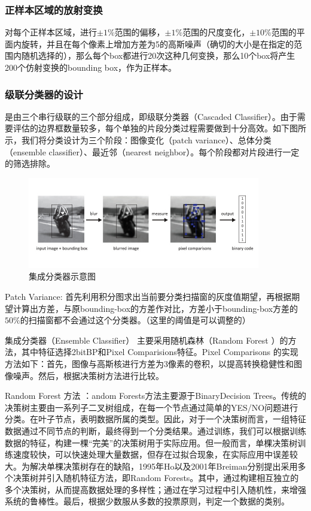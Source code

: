 \subsubsection{正样本区域的放射变换}
对每个正样本区域，进行$±1\%$范围的偏移，$±1\%$范围的尺度变化，$±10\%$范围的平面内旋转，并且在每个像素上增加方差为5的高斯噪声（确切的大小是在指定的范围内随机选择的），那么每个box都进行20次这种几何变换，那么10个box将产生200个仿射变换的bounding box，作为正样本。

\subsubsection{级联分类器的设计}
是由三个串行级联的三个部分组成，即级联分类器（Cascaded Classifier）。由于需要评估的边界框数量较多，每个单独的片段分类过程需要做到十分高效。如下图所示，我们将分类设计为三个阶段：图像变化（patch variance）、总体分类（ensemble classifier）、最近邻（nearest neighbor）。每个阶段都对片段进行一定的筛选排除。
\begin{figure}[htb]   
	\centering
	\includegraphics[width=\textwidth]{figs/161002_Thesis_Tracking_Section_04.pdf}
	\caption{集成分类器示意图}
	\label{fig:161002_Thesis_Tracking_Section_04}
\end{figure}

Patch Variance: 首先利用积分图求出当前要分类扫描窗的灰度值期望，再根据期望计算出方差，与原bounding-box的方差作对比，方差小于bounding-box方差的$50\%$的扫描窗都不会通过这个分类器。（这里的阈值是可以调整的）

集成分类器（Ensemble Classifier） 主要采用随机森林（Random Forest ）的方法，其中特征选择2bitBP和Pixel Comparisions特征。Pixel Comparisons 的实现方法如下：首先，图像与高斯核进行方差为3像素的卷积，以提高转换稳健性和图像噪声。然后，根据决策树方法进行比较。


Random Forest 方法 ：andom Forests方法主要源于BinaryDecision Trees。传统的决策树主要由一系列子二叉树组成，在每一个节点通过简单的YES/NO问题进行分类。在叶子节点，表明数据所属的类型。因此，对于一个决策树而言，一组特征数据通过不同节点的判断，最终得到一个分类结果。通过训练，我们可以根据训练数据的特征，构建一棵“完美”的决策树用于实际应用。但一般而言，单棵决策树训练速度较快，可以快速处理大量数据，但存在过拟合现象，在实际应用中误差较大。为解决单棵决策树存在的缺陷，1995年Ho以及2001年Breiman分别提出采用多个决策树并引入随机特征方法，即Random Forests。其中，通过构建相互独立的多个决策树，从而提高数据处理的多样性；通过在学习过程中引入随机性，来增强系统的鲁棒性。最后，根据少数服从多数的投票原则，判定一个数据的类别。

